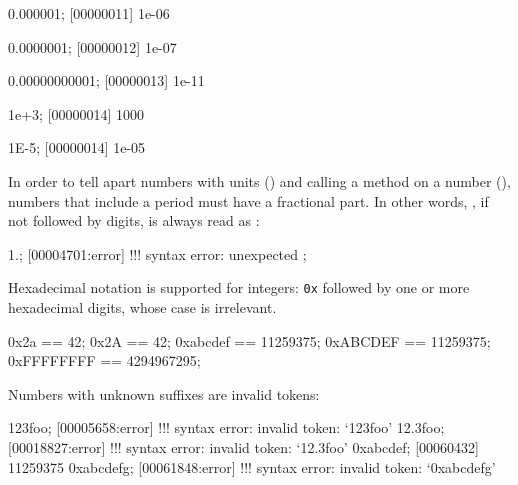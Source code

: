 \begin{urbiscript}
0.000001;
[00000011] 1e-06

0.0000001;
[00000012] 1e-07

0.00000000001;
[00000013] 1e-11

1e+3;
[00000014] 1000

1E-5;
[00000014] 1e-05
\end{urbiscript}

In order to tell apart numbers with units () and calling a method
on a number (), numbers that include a period must have a
fractional part.  In other words, , if not followed by digits, is
always read as :

\begin{urbiscript}
1.;
[00004701:error] !!! syntax error: unexpected ;
\end{urbiscript}

Hexadecimal notation is supported for integers: \lstinline|0x| followed by
one or more hexadecimal digits, whose case is irrelevant.

\begin{urbiassert}
      0x2a == 42;
      0x2A == 42;
  0xabcdef == 11259375;
  0xABCDEF == 11259375;
0xFFFFFFFF == 4294967295;
\end{urbiassert}

Numbers with unknown suffixes are invalid tokens:

\begin{urbiscript}
123foo;
[00005658:error] !!! syntax error: invalid token: `123foo'
12.3foo;
[00018827:error] !!! syntax error: invalid token: `12.3foo'
0xabcdef;
[00060432] 11259375
0xabcdefg;
[00061848:error] !!! syntax error: invalid token: `0xabcdefg'
\end{urbiscript}

